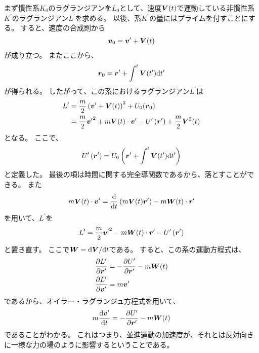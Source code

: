 \documentclass[a4paper]{jsarticle}
\def\vec#1{\mbox{\boldmath $#1$}}
\newcommand{\dif}[2]{\frac{{\rm d} #1}{{\rm d} #2}}
\newcommand{\pdif}[2]{\frac{\partial #1}{\partial #2}}
\newcommand{\ddif}{{\rm d}}
\begin{document}
まず慣性系$K_0$のラグランジアンを$L_0$として、速度$\vec{V}(t)$で運動している非慣性系$K^{\prime}$のラグランジアン$L^{\prime}$を求める。
以後、系$K^{\prime}$の量にはプライムを付すことにする。
すると、速度の合成則から
\begin{align}
	\vec{v}_0 = \vec{v}^{\prime} + \vec{V}(t)
\end{align}
が成り立つ。
またここから、
\begin{align}
	\vec{r}_0 = \vec{r}^{\prime} + \int^t \vec{V}(t^{\prime}) \ddif t^{\prime}
\end{align}
が得られる。
したがって、この系におけるラグランジアン$L^{\prime}$は
\begin{align}
	L^{\prime} &= \frac{m}{2} \left( \vec{v}^{\prime} + \vec{V}(t) \right)^2
	+ U_0(\vec{r}_0) \\
	&= \frac{m}{2} {\vec{v}^{\prime}}^2 + m \vec{V}(t) \cdot \vec{v}^{\prime}
	- U^{\prime} \left( \vec{r}^{\prime} \right) + \frac{m}{2} \vec{V}^2(t)
\end{align}
となる。
ここで、
\begin{align}
	U^{\prime} \left( \vec{r}^{\prime} \right) = U_0 \left(
		\vec{r}^{\prime} + \int^t \vec{V}(t^{\prime}) \ddif t^{\prime}
	\right)
\end{align}
と定義した。
最後の項は時間に関する完全導関数であるから、落とすことができる。
また
\begin{align}
	m \vec{V}(t) \cdot \vec{v}^{\prime} =
	\dif{}{t} \left( m \vec{V}(t) \vec{r}^{\prime} \right)
	- m \vec{W}(t) \cdot \vec{r}^{\prime}
\end{align}
を用いて、$L^{\prime}$を
\begin{align}
	L^{\prime} = \frac{m}{2} {\vec{v}^{\prime}}^2
	- m \vec{W}(t) \cdot \vec{r}^{\prime}
	- U^{\prime} \left( \vec{r}^{\prime} \right)
\end{align}
と置き直す。
ここで$\vec{W} = \ddif \vec{V} / \ddif t$である。
すると、この系の運動方程式は、
\begin{align}
	\pdif{L^{\prime}}{\vec{r}^{\prime}} &=
	-\pdif{U^{\prime}}{\vec{r}^{\prime}} - m\vec{W}(t)\\
	\pdif{L^{\prime}}{\vec{v}^{\prime}} &= m\vec{v}^{\prime}
\end{align}
であるから、オイラー・ラグランジュ方程式を用いて、
\begin{align}
	m\dif{\vec{v}^{\prime}}{t} = -\pdif{U^{\prime}}{\vec{r}^{\prime}} - m\vec{W}(t)
\end{align}
であることがわかる。
これはつまり、並進運動の加速度が、それとは反対向きに一様な力の場のように影響するということである。
\end{document}
